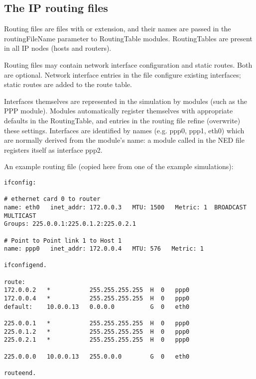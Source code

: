 
\subsection{The IP routing files}

Routing files are files with  or  extension,
and their names are passed in the routingFileName parameter
to RoutingTable modules. RoutingTables are present in all
IP nodes (hosts and routers).

Routing files may contain network interface configuration and static
routes. Both are optional. Network interface entries in the file
configure existing interfaces; static routes are added to the route table.

Interfaces themselves are represented in the simulation by modules
(such as the PPP module). Modules automatically register themselves
with appropriate defaults in the RoutingTable, and entries in the
routing file refine (overwrite) these settings.
Interfaces are identified by names (e.g. ppp0, ppp1, eth0) which
are normally derived from the module's name: a module called
 in the NED file registers itself as interface ppp2.

An example routing file (copied here from one of the example simulations):

\begin{verbatim}
ifconfig:

# ethernet card 0 to router
name: eth0   inet_addr: 172.0.0.3   MTU: 1500   Metric: 1  BROADCAST MULTICAST
Groups: 225.0.0.1:225.0.1.2:225.0.2.1

# Point to Point link 1 to Host 1
name: ppp0   inet_addr: 172.0.0.4   MTU: 576   Metric: 1

ifconfigend.

route:
172.0.0.2   *           255.255.255.255  H  0   ppp0
172.0.0.4   *           255.255.255.255  H  0   ppp0
default:    10.0.0.13   0.0.0.0          G  0   eth0

225.0.0.1   *           255.255.255.255  H  0   ppp0
225.0.1.2   *           255.255.255.255  H  0   ppp0
225.0.2.1   *           255.255.255.255  H  0   ppp0

225.0.0.0   10.0.0.13   255.0.0.0        G  0   eth0

routeend.
\end{verbatim}

